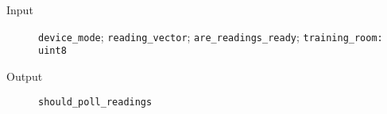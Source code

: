 \begin{flushleft}
  \begin{description}
    \item [Input]
      \verb#device_mode#;
      \verb#reading_vector#;
      \verb#are_readings_ready#;
      \verb#training_room: uint8#
    \item [Output]
      \verb#should_poll_readings#
  \end{description}
\end{flushleft}
